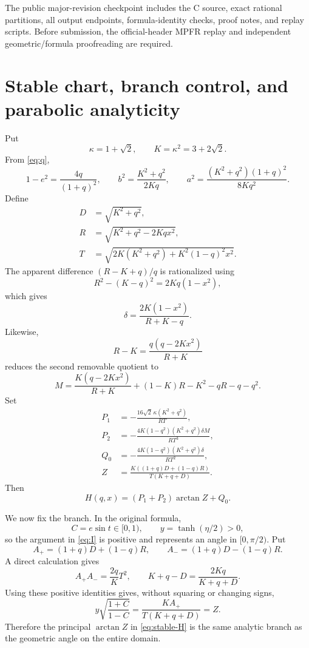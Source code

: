 \documentclass[11pt]{article}
\numberwithin{equation}{section}
\theoremstyle{remark}
\begin{document}
The public major-revision checkpoint includes the C source, exact rational partitions, all output endpoints, formula-identity checks, proof notes, and replay scripts.  Before submission, the official-header MPFR replay and independent geometric/formula proofreading are required.

\appendix

\section{Stable chart, branch control, and parabolic analyticity}
\label{app:q-chart}

Put
\[
  \kappa=1+\sqrt2,
  \qquad K=\kappa^2=3+2\sqrt2.
\]
From \eqref{eq:q},
\[
  1-e^2=\frac{4q}{(1+q)^2},
  \qquad
  b^2=\frac{K^2+q^2}{2Kq},
  \qquad
  a^2=\frac{(K^2+q^2)(1+q)^2}{8Kq^2}.
\]
Define
\begin{align*}
  D&=\sqrt{K^2+q^2},\\
  R&=\sqrt{K^2+q^2-2Kqx^2},\\
  T&=\sqrt{2K(K^2+q^2)+K^2(1-q)^2x^2}.
\end{align*}
The apparent difference \((R-K+q)/q\) is rationalized using
\[
  R^2-(K-q)^2=2Kq(1-x^2),
\]
which gives
\[
  \delta=\frac{2K(1-x^2)}{R+K-q}.
\]
Likewise,
\[
  R-K=\frac{q(q-2Kx^2)}{R+K}
\]
reduces the second removable quotient to
\[
  M=\frac{K(q-2Kx^2)}{R+K}+(1-K)R-K^2-qR-q-q^2.
\]
Set
\begin{align*}
  P_1&=-\frac{16\sqrt2\,\kappa(K^2+q^2)}{RT},\\
  P_2&=-\frac{4K(1-q^2)(K^2+q^2)\delta M}{RT^3},\\
  Q_0&=-\frac{4K(1-q^2)(K^2+q^2)\delta}{RT^2},\\
  Z&=\frac{K((1+q)D+(1-q)R)}{T(K+q+D)}.
\end{align*}
Then
\begin{equation}
  H(q,x)=(P_1+P_2)\arctan Z+Q_0.
  \label{eq:stable-H}
\end{equation}

We now fix the branch.  In the original formula,
\[
  C=e\sin t\in[0,1),
  \qquad y=\tanh(\eta/2)>0,
\]
so the argument in \eqref{eq:I} is positive and represents an angle in \([0,\pi/2)\).  Put
\[
  A_+=(1+q)D+(1-q)R,
  \qquad
  A_-=(1+q)D-(1-q)R.
\]
A direct calculation gives
\[
  A_+A_-=\frac{2q}{K}T^2,
  \qquad
  K+q-D=\frac{2Kq}{K+q+D}.
\]
Using these positive identities gives, without squaring or changing signs,
\[
  y\sqrt{\frac{1+C}{1-C}}
  =\frac{KA_+}{T(K+q+D)}=Z.
\]
Therefore the principal \(\arctan Z\) in \eqref{eq:stable-H} is the same analytic branch as the geometric angle on the entire domain.
\end{document}
